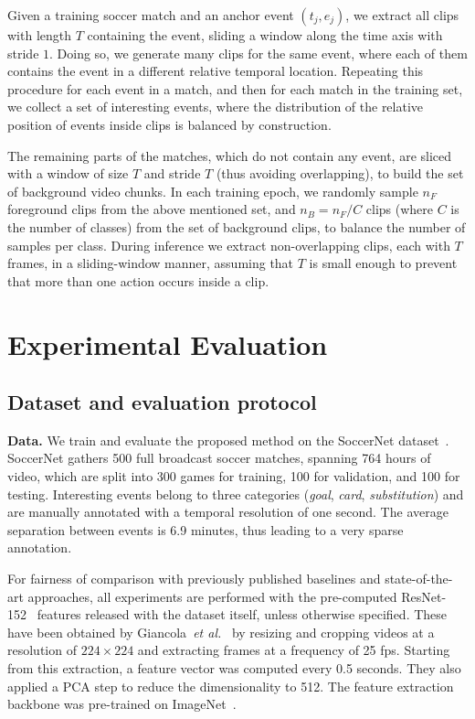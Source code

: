 \documentclass[a4paper,conference]{IEEEtran}
\newcommand{\tit}[1]{\smallbreak\noindent\textbf{#1.}}
\def \etal {\emph{et al.}}
\begin{document}
Given a training soccer match and an anchor event $(t_{j}, e_{j})$, we extract all clips with length $T$ containing the event, sliding a window along the time axis with stride $1$. Doing so, we generate many clips for the same event, where each of them contains the event in a different relative temporal location. Repeating this procedure for each event in a match, and then for each match in the training set, we collect a set of interesting events, where the distribution of the relative position of events inside clips is balanced by construction.

The remaining parts of the matches, which do not contain any event, are sliced with a window of size $T$ and stride $T$ (thus avoiding overlapping), to build the set of background video chunks.
In each training epoch, we randomly sample $n_{F}$ foreground clips from the above mentioned set, and $n_{B} = n_{F} / C$ clips (where $C$ is the number of classes) from the set of background clips, to balance the number of samples per class. During inference we extract non-overlapping clips, each with $T$ frames, in a sliding-window manner, assuming that $T$ is small enough to prevent that more than one action occurs inside a clip.

\section{Experimental Evaluation}
\label{sec:experiments}

\subsection{Dataset and evaluation protocol}
\tit{Data}
We train and evaluate the proposed method on the SoccerNet dataset~\cite{giancola2018soccernet}. SoccerNet gathers 500 full broadcast soccer matches, spanning 764 hours of video, which are split into 300 games for training, 100 for validation, and 100 for testing. Interesting events belong to three categories (\textit{goal}, \textit{card}, \textit{substitution}) and are manually annotated with a temporal resolution of one second. The average separation between events is 6.9 minutes, thus leading to a very sparse annotation. 

For fairness of comparison with previously published baselines and state-of-the-art approaches, all experiments are performed with the pre-computed ResNet-152~\cite{he2016deep} features released with the dataset itself, unless otherwise specified. These have been obtained by Giancola~\etal~\cite{giancola2018soccernet} by resizing and cropping videos at a resolution of $224 \times 224$ and extracting frames at a frequency of 25 fps. Starting from this extraction, a feature vector was computed every 0.5 seconds. They also applied a PCA step to reduce the dimensionality to 512. The feature extraction backbone was pre-trained on ImageNet~\cite{deng2009imagenet}.
\end{document}
